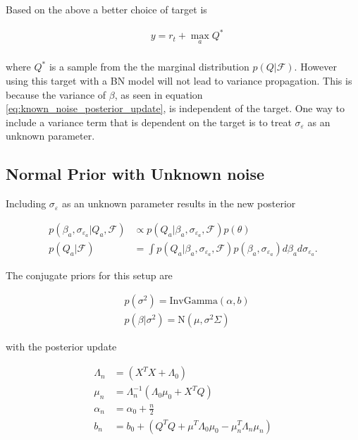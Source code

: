 Based on the above a better choice of target is

\begin{equation}
\begin{split}
&y = r_t + \max_a Q^* \\
\end{split}
\end{equation}

where $Q^*$ is a sample from the the marginal distribution $p(Q|\mathcal{F})$. However using this target with a BN model will not lead to variance propagation. This is because the variance of $\beta$, as seen in equation \ref{eq:known_noise_posterior_update}, is independent of the target. One way to include a variance term that is dependent on the target is to treat $\sigma_{\varepsilon}$ as an unknown parameter.

\subsection{Normal Prior with Unknown noise}

Including $\sigma_{\varepsilon}$ as an unknown parameter results in the new posterior 

\begin{align*}
    p(\beta_a, \sigma_{\varepsilon_a}|Q_a, \mathcal{F}) &\propto p(Q_a| \beta_a, \sigma_{\varepsilon_a}, \mathcal{F})p(\theta) \\
    p(Q_a|\mathcal{F}) &= \int p(Q_a|\beta_a, \sigma_{\varepsilon_a}, \mathcal{F}) p(\beta_a, \sigma_{\varepsilon_a})d\beta_a d\sigma_{\varepsilon_a}.
\end{align*}

The conjugate priors for this setup are

\begin{align*}
    & p(\sigma^2) = \text{InvGamma}(\alpha, b)          \\
    & p(\beta|\sigma^2) = \text{N}(\mu, \sigma^2\Sigma) 
\end{align*}

with the posterior update

\begin{align*}
    \label{eq:unknown_noise_posterior_update}
	\Lambda_n & = (X^TX + \Lambda_0)                                         \\
	\mu_n     & = \Lambda_n^{-1}(\Lambda_0\mu_0 + X^TQ)                      \\
	\alpha_n  & = \alpha_0 + \frac{n}{2}                                     \\
	b_n       & = b_0 + (Q^TQ + \mu^T\Lambda_0\mu_0 - \mu_n^T\Lambda_n\mu_n) 
\end{align*}

